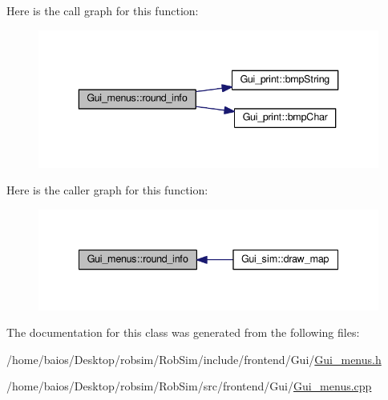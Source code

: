 Here is the call graph for this function\-:
\nopagebreak
\begin{figure}[H]
\begin{center}
\leavevmode
\includegraphics[width=340pt]{class_gui__menus_a36b5bf60d6fb755a34ab7acb100ffac6_cgraph}
\end{center}
\end{figure}




Here is the caller graph for this function\-:
\nopagebreak
\begin{figure}[H]
\begin{center}
\leavevmode
\includegraphics[width=338pt]{class_gui__menus_a36b5bf60d6fb755a34ab7acb100ffac6_icgraph}
\end{center}
\end{figure}




The documentation for this class was generated from the following files\-:\begin{DoxyCompactItemize}
\item 
/home/baios/\-Desktop/robsim/\-Rob\-Sim/include/frontend/\-Gui/\hyperlink{_gui__menus_8h}{Gui\-\_\-menus.\-h}\item 
/home/baios/\-Desktop/robsim/\-Rob\-Sim/src/frontend/\-Gui/\hyperlink{_gui__menus_8cpp}{Gui\-\_\-menus.\-cpp}\end{DoxyCompactItemize}
